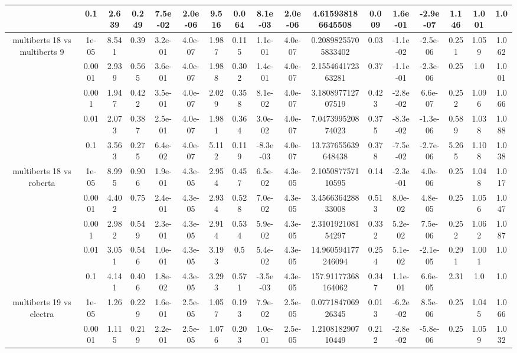 \begin{tabular}{|c|c|c|c|c|c|c|c|c|c|c|c|c|c|c|c|c|}
 & 0.1 & 2.639 & 0.249 & 7.5e-02 & 2.0e-06 & 9.516 & 0.064 & 8.1e-03 & 2.0e-06 & 4.615938186645508 & 0.009 & 1.6e-01 & -2.9e-07 & 1.146 & 1.001 & 1.0 \\
\hline
\multirow{5}{*}{multiberts 18 vs multiberts 9} & 1e-05 & 8.541 & 0.39 & 3.2e-01 & 4.0e-07 & 1.987 & 0.115 & 1.1e-01 & 4.0e-07 & 0.20898255705833402 & 0.03 & -1.1e-02 & -2.5e-06 & 0.251 & 1.059 & 1.062 \\
 & 0.0001 & 2.939 & 0.565 & 3.6e-01 & 4.0e-07 & 1.988 & 0.302 & 1.4e-01 & 4.0e-07 & 2.155464172363281 & 0.37 & -1.1e-01 & -2.3e-06 & 0.25 & 1.0 & 1.001 \\
 & 0.001 & 1.947 & 0.422 & 3.5e-01 & 4.0e-07 & 2.029 & 0.358 & 8.1e-02 & 4.0e-07 & 3.180897712707519 & 0.423 & -2.8e-02 & 6.6e-07 & 0.252 & 1.096 & 1.066 \\
 & 0.01 & 2.073 & 0.387 & 2.5e-01 & 4.0e-07 & 1.981 & 0.364 & 3.0e-02 & 4.0e-07 & 7.047399520874023 & 0.375 & -8.3e-02 & -1.3e-06 & 0.589 & 1.038 & 1.088 \\
 & 0.1 & 3.563 & 0.275 & 6.4e-02 & 4.0e-07 & 5.112 & 0.119 & -8.3e-03 & 4.0e-07 & 13.737655639648438 & 0.378 & -7.5e-02 & -2.7e-06 & 5.265 & 1.108 & 1.038 \\
\hline
\multirow{5}{*}{multiberts 18 vs roberta } & 1e-05 & 8.995 & 0.906 & 1.9e-01 & 4.3e-05 & 2.954 & 0.457 & 6.5e-02 & 4.3e-05 & 2.105087757110595 & 0.14 & -2.3e-01 & 4.0e-06 & 0.25 & 1.048 & 1.017 \\
 & 0.0001 & 4.402 & 0.75 & 2.4e-01 & 4.3e-05 & 2.934 & 0.528 & 7.0e-02 & 4.3e-05 & 3.456636428833008 & 0.513 & 8.0e-02 & 4.8e-05 & 0.25 & 1.056 & 1.047 \\
 & 0.001 & 2.982 & 0.549 & 2.3e-01 & 4.3e-05 & 2.914 & 0.534 & 5.9e-02 & 4.3e-05 & 2.310192108154297 & 0.332 & 5.2e-02 & 7.5e-06 & 0.252 & 1.062 & 1.087 \\
 & 0.01 & 3.051 & 0.546 & 1.0e-01 & 4.3e-05 & 3.193 & 0.5 & 5.4e-02 & 4.3e-05 & 14.960594177246094 & 0.254 & 5.1e-02 & -2.1e-05 & 0.291 & 1.001 & 1.0 \\
 & 0.1 & 4.141 & 0.406 & 1.8e-02 & 4.3e-05 & 3.293 & 0.571 & -3.5e-03 & 4.3e-05 & 157.91177368164062 & 0.347 & 1.1e-01 & 6.6e-05 & 2.31 & 1.0 & 1.0 \\
\hline
\multirow{5}{*}{multiberts 19 vs electra } & 1e-05 & 1.26 & 0.229 & 1.6e-01 & 2.5e-05 & 1.057 & 0.193 & 7.9e-02 & 2.5e-05 & 0.077184706926345 & 0.013 & -6.2e-02 & 8.5e-06 & 0.25 & 1.045 & 1.066 \\
 & 0.0001 & 1.115 & 0.219 & 2.2e-01 & 2.5e-05 & 1.076 & 0.203 & 1.0e-01 & 2.5e-05 & 1.210818290710449 & 0.212 & -2.8e-02 & -5.8e-06 & 0.25 & 1.059 & 1.032 \\

\end{tabular}
